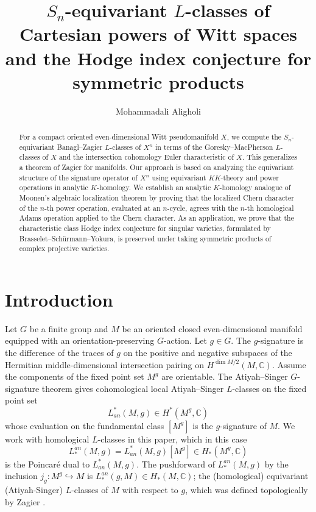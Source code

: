 \documentclass[11pt,leqno,twoside]{amsart}
\title[Hodge index theorem for symmetric products]{\(S_n\)-equivariant \(L\)-classes of Cartesian powers of Witt spaces and the Hodge index conjecture for symmetric products}
\author{Mohammadali Aligholi}
\date{}
\theoremstyle{plainsl}
\theoremstyle{definition}
\begin{document}
\raggedbottom
\begin{abstract}






For a compact oriented even-dimensional Witt pseudomanifold $X$, we compute the $S_n$-equivariant Banagl--Zagier $L$-classes of $X^n$ in terms of the Goresky--MacPherson $L$-classes of $X$ and the intersection cohomology Euler characteristic of $X$. This generalizes a theorem of \mbox{Zagier}  for \mbox{manifolds}. Our approach is based on analyzing the equivariant structure of the signature operator of $X^n$ using equivariant $KK$-theory and power operations in analytic $K$-homology. We establish an analytic $K$-homology analogue of Moonen's algebraic localization theorem by proving that the localized Chern character of the $n$-th power operation, evaluated at an $n$-cycle, agrees with the $n$-th homological Adams operation applied to the Chern character. As an application, we prove that the characteristic class Hodge index conjecture for singular varieties, formulated by Brasselet--Sch\"urmann--Yokura, is preserved under taking symmetric products of complex projective varieties.






\end{abstract}
\setcounter{tocdepth}{3}
\maketitle
\tableofcontents





\section{Introduction}


Let $G$ be a finite group and $M$ be an oriented
closed even-dimensional manifold equipped with an
orientation-preserving $G$-action. Let $g\in G$. The $g$-signature is the difference of the traces of $g$ on the positive and negative subspaces of the Hermitian middle-dimensional intersection pairing on $H^{\dim M/2}(M,\mathbb C)$.  Assume the components of the fixed point set $M^g$ are orientable. The
Atiyah--Singer $G$-signature theorem \cite{AS3} gives cohomological local Atiyah--Singer $L$-classes on the fixed point set  
\[L_{an}^*(M,g)\in H^*(M^g,\mathbb{C}) \]
whose evaluation on the fundamental class $[M^g]$ is the \(g\)-signature of $M$. We work with homological $L$-classes in this paper, which in this case $$L^{an}_*(M,g)=L_{an}^*(M,g)[M^g] \in H_*(M^g,\mathbb{C})$$ is the Poincaré dual to $L_{an}^*(M,g)$. The pushforward of $L^{an}_*(M,g)$ by the inclusion $j_g:M^g\hookrightarrow M$ is $L^{an}_*(g,M)\in H_*(M,\mathbb{C})$; the (homological) equivariant (Atiyah-Singer) $L$-classes of $M$ with respect to $g$, which was defined topologically by Zagier \cite{Z}.
\end{document}
